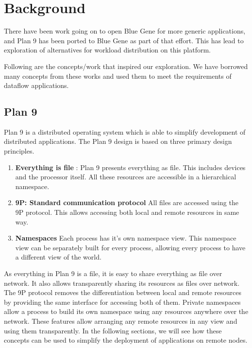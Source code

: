 \chapter{Background}
\label{chap:background}

\ifpdf
	\graphicspath{{Chapter1/Chapter1Figs/PDF/}{Chapter1/Chapter1Figs/PNG/}
		{Chapter1/Chapter1Figs/}}
\else
	\graphicspath{{Chapter1/Chapter1Figs/EPS/}{Chapter1/Chapter1Figs/}}
\fi

There have been work going on to open Blue Gene for more generic applications,
and Plan 9 has been ported to Blue Gene\cite{Van07} as part of that effort.
This has lead to exploration of alternatives for workload distribution on this
platform.

Following are the concepts/work that inspired our exploration.  We have borrowed
many concepts from these works and used them to meet the requirements of dataflow applications.


\section{Plan 9}
Plan 9 is a distributed operating system which is able to simplify development of
distributed applications. The Plan 9 design is based on three primary design principles.
\begin{enumerate}
	\item \textbf{Everything is file} : Plan 9 presents everything as file. This includes
devices and the processor itself.  All these resources are accessible in a hierarchical
namespace.
	\item \textbf{9P: Standard communication protocol} All files are accessed using the
9P protocol. This allows accessing both local and remote resources in same way.
	\item \textbf{Namespaces} Each process has it's own namespace view.  This namespace
view can be separately built for every process, allowing every process to have
a different view of the world.\cite{namespace}
\end{enumerate}

As everything in Plan 9 is a file, it is easy to share everything as file over network.  It also
allows transparently sharing its resources as files over network.  The 9P protocol
removes the differentiation between local and remote resources by providing the same
interface for accessing both of them.  Private namespaces allow a process to build
its own namespace using any resources anywhere over the network.  These features allow
arranging any remote resources in any view and using them transparently.  In the following
sections, we will see how these concepts can be used to simplify the deployment
of applications on remote nodes.


